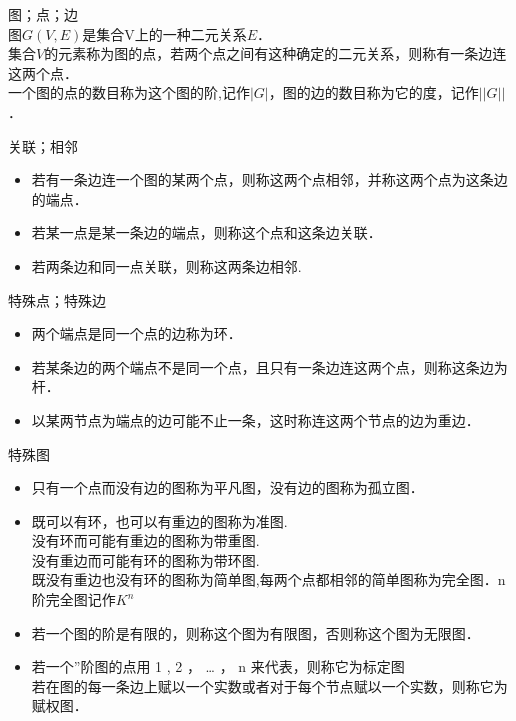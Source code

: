 \begin{issues}
\end{issues}
\begin{definition}{图；点；边}
\\图$G(V,E)$是集合V上的一种二元关系$E$．
\\集合$V$的元素称为图的点，若两个点之间有这种确定的二元关系，则称有一条边连这两个点．
\\一个图的点的数目称为这个图的阶,记作$|G|$，图的边的数目称为它的度，记作$||G||$．
\end{definition}
\begin{definition}{关联；相邻}
\begin{itemize}
\item 若有一条边连一个图的某两个点，则称这两个点相邻，并称这两个点为这条边的端点．
\item 若某一点是某一条边的端点，则称这个点和这条边关联．
\item 若两条边和同一点关联，则称这两条边相邻.
\end{itemize}
\end{definition}
\begin{definition}{特殊点；特殊边}
\begin{itemize}
\item 两个端点是同一个点的边称为环．
\item 若某条边的两个端点不是同一个点，且只有一条边连这两个点，则称这条边为杆．
\item 以某两节点为端点的边可能不止一条，这时称连这两个节点的边为重边．
\end{itemize}
\end{definition}
\begin{definition}{特殊图}
\begin{itemize}
\item 只有一个点而没有边的图称为平凡图，没有边的图称为孤立图．
\item 既可以有环，也可以有重边的图称为准图.
\\没有环而可能有重边的图称为带重图.
\\没有重边而可能有环的图称为带环图.
\\既没有重边也没有环的图称为简单图,每两个点都相邻的简单图称为完全图．n阶完全图记作$K^{n}$
\item 若一个图的阶是有限的，则称这个图为有限图，否则称这个图为无限图．
\item 若一个”阶图的点用 1 , 2 ， … ， n 来代表，则称它为标定图
\\若在图的每一条边上赋以一个实数或者对于每个节点赋以一个实数，则称它为赋权图．
\end{itemize}
\end{definition}

